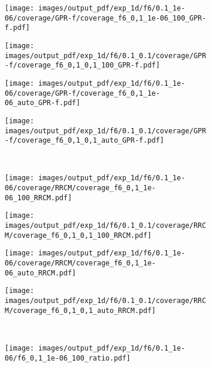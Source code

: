\documentclass[a4paper,14pt]{extarticle}
\begin{document}
\begin{figure}%
  \centering
  \begin{subfigure}[b]{0.25\linewidth}
    \texttt{[image: images/output\_pdf/exp\_1d/f6/0.1\_1e-06/coverage/GPR-f/coverage\_f6\_0,1\_1e-06\_100\_GPR-f.pdf]}
  \end{subfigure}%
  \begin{subfigure}[b]{0.25\linewidth}
    \texttt{[image: images/output\_pdf/exp\_1d/f6/0.1\_0.1/coverage/GPR-f/coverage\_f6\_0,1\_0,1\_100\_GPR-f.pdf]}
  \end{subfigure}%
  \begin{subfigure}[b]{0.25\linewidth}
    \texttt{[image: images/output\_pdf/exp\_1d/f6/0.1\_1e-06/coverage/GPR-f/coverage\_f6\_0,1\_1e-06\_auto\_GPR-f.pdf]}
  \end{subfigure}%
  \begin{subfigure}[b]{0.25\linewidth}
    \texttt{[image: images/output\_pdf/exp\_1d/f6/0.1\_0.1/coverage/GPR-f/coverage\_f6\_0,1\_0,1\_auto\_GPR-f.pdf]}
  \end{subfigure}\\
  \begin{subfigure}[b]{0.25\linewidth}
    \texttt{[image: images/output\_pdf/exp\_1d/f6/0.1\_1e-06/coverage/RRCM/coverage\_f6\_0,1\_1e-06\_100\_RRCM.pdf]}
  \end{subfigure}%
  \begin{subfigure}[b]{0.25\linewidth}
    \texttt{[image: images/output\_pdf/exp\_1d/f6/0.1\_0.1/coverage/RRCM/coverage\_f6\_0,1\_0,1\_100\_RRCM.pdf]}
  \end{subfigure}%
  \begin{subfigure}[b]{0.25\linewidth}
    \texttt{[image: images/output\_pdf/exp\_1d/f6/0.1\_1e-06/coverage/RRCM/coverage\_f6\_0,1\_1e-06\_auto\_RRCM.pdf]}
  \end{subfigure}%
  \begin{subfigure}[b]{0.25\linewidth}
    \texttt{[image: images/output\_pdf/exp\_1d/f6/0.1\_0.1/coverage/RRCM/coverage\_f6\_0,1\_0,1\_auto\_RRCM.pdf]}
  \end{subfigure}\\
  \begin{subfigure}[b]{0.25\linewidth}
    \texttt{[image: images/output\_pdf/exp\_1d/f6/0.1\_1e-06/f6\_0,1\_1e-06\_100\_ratio.pdf]}
    \caption{} \label{fig:f6_1d_high_noise_c1}
  \end{subfigure}%

\end{figure}
\end{document}
